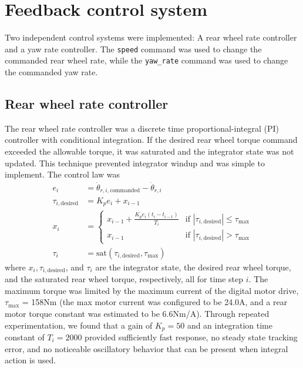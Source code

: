 \section{Feedback control system}
Two independent control systems were implemented: A rear wheel rate controller
and a yaw rate controller. The \verb|speed| command was used to change the
commanded rear wheel rate, while the \verb|yaw_rate| command was used to change
the commanded yaw rate.

\subsection{Rear wheel rate controller} \label{rb:subsec:rw_control}
The rear wheel rate controller was a discrete time proportional-integral (PI)
controller with conditional integration. If the desired rear wheel torque
command exceeded the allowable torque, it was saturated and the integrator
state was not updated. This technique prevented integrator windup and was
simple to implement. The control law was
\begin{align}
  e_i &= \dot{\theta}_{r,i,\text{commanded}} - \dot{\theta}_{r,i} \\
  \tau_{i,\text{desired}} &= K_p e_i + x_{i-1}\\
  x_{i} &= \left\{
      \begin{matrix}
        x_{i-1} + \frac{K_p e_i (t_i - t_{i-1})}{T_i} & \text{if } |\tau_{i,\text{desired}}| \leq \tau_{\text{max}} \\
        x_{i-1} & \text{if } |\tau_{i,\text{desired}}| > \tau_{\text{max}}
      \end{matrix}
    \right. \\
  \tau_{i} &= \text{sat}(\tau_{i, \text{desired}}, \tau_{\text{max}})
\end{align}
where $x_{i}, \tau_{i,\text{desired}}$, and  $\tau_{i}$ are the integrator
state, the desired rear wheel torque, and the saturated rear wheel torque,
respectively, all for time step $i$. The maximum torque was limited by the
maximum current of the digital motor drive, $\tau_{\text{max}}$ = 158Nm (the
max motor current was configured to be 24.0A, and a rear motor torque constant
was estimated to be 6.6Nm/A). Through repeated experimentation, we found that a
gain of $K_p =50$ and an integration time constant of $T_i = 2000$ provided
sufficiently fast response, no steady state tracking error, and no noticeable
oscillatory behavior that can be present when integral action is used.

